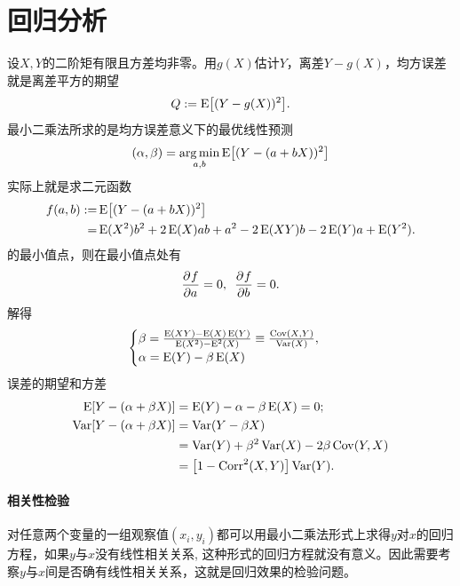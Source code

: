\section{回归分析}

设$X,Y$的二阶矩有限且方差均非零。用$g(X)$估计$Y$，离差$Y - g(X)$，均方误差就是离差平方的期望
\[
	Q := \operatorname{E}\bigl[(Y - g(X))^2\bigr].
\]
最小二乘法所求的是均方误差意义下的最优线性预测
\begin{equation}\label{eq:ps-least-squares-predictor}
	(\alpha,\beta) = \operatorname*{arg\,min}_{a,b}\operatorname{E}\bigl[(Y - (a + bX))^2\bigr]
\end{equation}
实际上就是求二元函数
\begin{align*}
	f(a,b) :=&{}\operatorname{E}\bigl[(Y - (a + bX))^2\bigr]\\
	=&{}\operatorname{E}(X^2)b^2 + 2\operatorname{E}(X)ab + a^2 - 2\operatorname{E}(XY)b - 2\operatorname{E}(Y)a + \operatorname{E}(Y^2).
\end{align*}
的最小值点，则在最小值点处有
\[
	\frac{\partial^{}f}{\partial{a}^{}} = 0,\enspace\frac{\partial^{}f}{\partial{b}^{}} = 0.
\]
解得
\begin{equation}
	\begin{cases}
		\beta = \frac{\operatorname{E}(XY) - \operatorname{E}(X)\operatorname{E}(Y)}{\operatorname{E}(X^2) - \operatorname{E}^2(X)} \equiv \frac{\operatorname{Cov}(X,Y)}{\operatorname{Var}(X)},\\
		\alpha = \operatorname{E}(Y) - \beta\operatorname{E}(X)
	\end{cases}
\end{equation}
误差的期望和方差
\begin{align*}
	\E[Y - (\alpha + \beta X)] &= \E(Y) - \alpha - \beta\E(X) = 0;\\
	\Var[Y - (\alpha + \beta X)] &= \Var(Y - \beta X)\\
	&= \Var(Y) + \beta^2\Var(X) - 2\beta\Cov(Y,X)\\
	&=%
	\bigb{1 - \Corr^2(X,Y)}\Var(Y).
\end{align*}
\paragraph{相关性检验}
对任意两个变量的一组观察值$ {(x_i, y_i)} $都可以用最小二乘法形式上求得$ y$对$ x $的回归方程，如果$ y $与$ x $没有线性相关关系, 这种形式的回归方程就没有意义。因此需要考察$ y $与$ x $间是否确有线性相关关系，这就是回归效果的检验问题。

